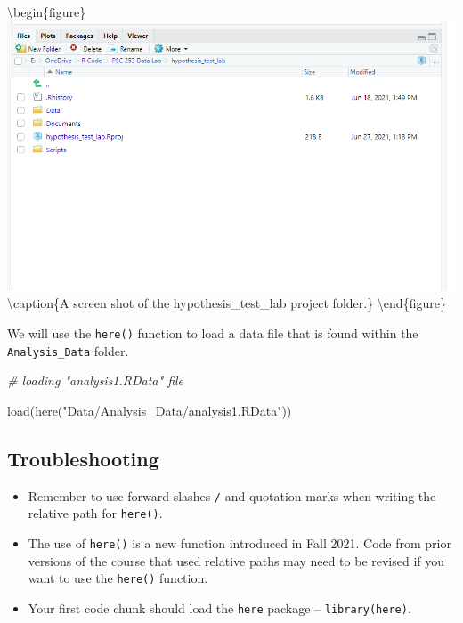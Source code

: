 \documentclass[
]{book}
\newenvironment{Shaded}{\begin{snugshade}}{\end{snugshade}}
\newcommand{\CommentTok}[1]{\textcolor[rgb]{0.56,0.35,0.01}{\textit{#1}}}
\newcommand{\FunctionTok}[1]{\textcolor[rgb]{0.00,0.00,0.00}{#1}}
\newcommand{\NormalTok}[1]{#1}
\newcommand{\StringTok}[1]{\textcolor[rgb]{0.31,0.60,0.02}{#1}}
\providecommand{\tightlist}{%
  \setlength{\itemsep}{0pt}\setlength{\parskip}{0pt}}
\begin{document}
\textbackslash begin\{figure\}
\includegraphics[width=11.89in]{images/here_example1} \textbackslash caption\{A screen shot of the hypothesis\_test\_lab project folder.\}\label{fig:here-example}
\textbackslash end\{figure\}

We will use the \texttt{here()} function to load a data file that is found within the \texttt{Analysis\_Data} folder.

\begin{Shaded}
\begin{Highlighting}[]
\CommentTok{\# loading "analysis1.RData" file}

\FunctionTok{load}\NormalTok{(}\FunctionTok{here}\NormalTok{(}\StringTok{"Data/Analysis\_Data/analysis1.RData"}\NormalTok{))}
\end{Highlighting}
\end{Shaded}

\hypertarget{troubleshooting-6}{%
\subsection{Troubleshooting}\label{troubleshooting-6}}

\begin{itemize}
\tightlist
\item
  Remember to use forward slashes \texttt{/} and quotation marks when writing the relative path for \texttt{here()}.
\item
  The use of \texttt{here()} is a new function introduced in Fall 2021. Code from prior versions of the course that used relative paths may need to be revised if you want to use the \texttt{here()} function.
\item
  Your first code chunk should load the \texttt{here} package -- \texttt{library(here)}.
\end{itemize}
\end{document}
